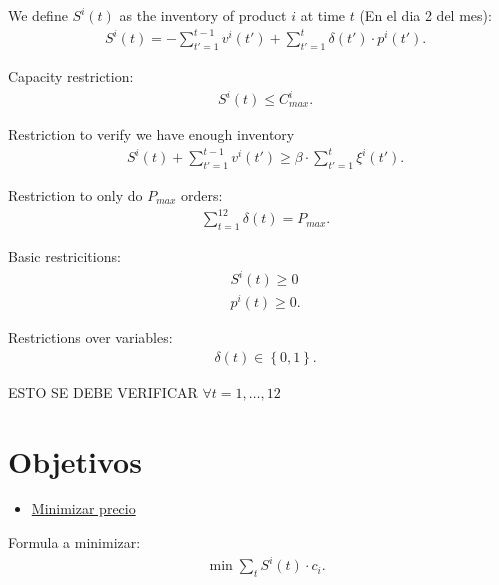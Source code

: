 \documentclass[a4paper]{article}
\theoremstyle{definition}
\begin{document}
\begin{definition}
We define $S^{i}\left( t \right) $ as the inventory of product  $i$ at time  $t$ (En el dia 2 del mes):
 \begin{align*}
	&S^{i}\left( t \right) = - \sum_{t'=1}^{t-1} v^{i}\left( t' \right)  + \sum_{t'=1}^{t} \delta\left( t' \right) \cdot p^{i}\left( t' \right) 
.\end{align*}
\end{definition}


\vspace{5mm}

Capacity restriction:
\begin{align*}
	&S^{i}\left( t \right) \le C^{i}_{max}
.\end{align*}

Restriction to verify we have enough inventory
\begin{align*}
	&S^{i}\left( t \right) + \sum_{t'=1}^{t-1} v^{i}\left( t' \right) \ge \beta\cdot \sum_{t'=1}^{t} \xi^{i}\left( t' \right) 
.\end{align*}


Restriction to only do $P_{max}$ orders:
\begin{align*}
	&\sum_{t=1}^{12} \delta\left( t \right) = P_{max}
.\end{align*}

Basic restricitions:
\begin{align*}
	&S^{i}\left( t \right) \ge  0\\
	&p^{i}\left( t \right) \ge 0
.\end{align*}

Restrictions over variables:
\begin{align*}
	&\delta \left( t \right) \in  \left\{ 0,1 \right\} 
.\end{align*}


\begin{remark}
ESTO SE DEBE VERIFICAR $\forall t = 1,\ldots,12$
\end{remark}

\vspace{15mm}

\section{Objetivos}

\begin{itemize}
	\item \underline{Minimizar precio}
\end{itemize}

Formula a minimizar:
\begin{align*}
	&\min \sum_{t}^{} S^{i}\left( t \right) \cdot c_i
.\end{align*}
\end{document}
